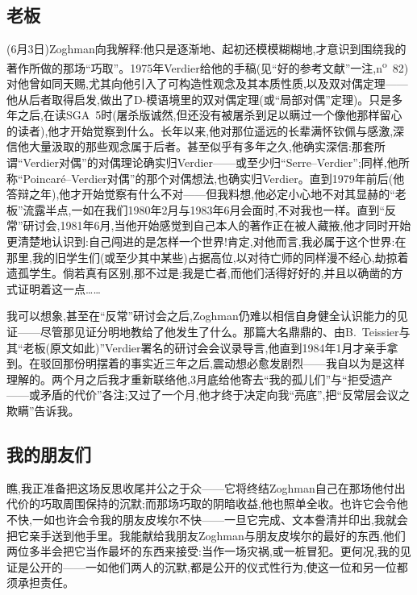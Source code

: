 \subsection{老板}


(6月3日)Zoghman向我解释:他只是逐渐地、起初还模模糊糊地,才意识到围绕我的著作所做的那场“巧取”。1975年Verdier给他的手稿(见“好的参考文献”一注,n\textsuperscript{o}~82)对他曾如同天赐,尤其向他引入了可构造性观念及其本质性质,以及双对偶定理——他从后者取得启发,做出了D-模语境里的双对偶定理(或“局部对偶”定理)。只是多年之后,在读SGA~5时(屠杀版诚然,但还没有被屠杀到足以瞒过一个像他那样留心的读者),他才开始觉察到什么。长年以来,他对那位遥远的长辈满怀钦佩与感激,深信他大量汲取的那些观念属于后者。甚至似乎有多年之久,他确实深信:那套所谓“Verdier对偶”的对偶理论确实归Verdier——或至少归“Serre--Verdier”;同样,他所称“Poincaré--Verdier对偶”的那个对偶想法,也确实归Verdier。直到1979年前后(他答辩之年),他才开始觉察有什么不对——但我料想,他必定小心地不对其显赫的“老板”流露半点,一如在我们1980年2月与1983年6月会面时,不对我也一样。直到“反常”研讨会,1981年6月,当他开始感觉到\dmark{}自己本人的著作正在被人藏掖,他才同时开始更清楚地认识到:自己闯进的是怎样一个世界!肯定,对他而言,我必属于这个世界:在那里,我的旧学生们(或至少其中某些)占据高位,以对待亡师的同样漫不经心,劫掠着遗孤学生。倘若真有区别,那不过是:我是亡者,而他们活得好好的,并且以确凿的方式证明着这一点……

我可以想象,甚至在“反常”研讨会之后,Zoghman仍难以相信自身健全认识能力的见证——尽管那见证分明地教给了他发生了什么。那篇大名鼎鼎的、由B.~Teissier与其“老板(原文如此)”Verdier署名的研讨会会议录导言,他直到1984年1月才亲手拿到。在驳回那份明摆着的事实近三年之后,震动想必愈发剧烈——我自以为是这样理解的。两个月之后我才重新联络他,3月底给他寄去“我的孤儿们”与“拒受遗产——或矛盾的代价”各注;又过了一个月,他才终于决定向我“亮底”,把“反常层会议之欺瞒”告诉我。

\subsection{我的朋友们}


瞧,我正准备把这场反思收尾并公之于众——它将终结Zoghman自己在那场他付出代价的巧取周围保持的沉默;而那场巧取的阴暗收益,他也照单全收。也许它会令他不快,一如也许会令我的朋友皮埃尔不快——一旦它完成、文本誊清并印出,我就会把它亲手送到他手里。我能献给我朋友Zoghman与朋友皮埃尔的\dmark{}最好的东西,他们两位多半会把它当作最坏的东西来接受:当作一场灾祸,或一桩冒犯。更何况,我的见证是公开的——一如他们两人的沉默,都是公开的仪式性行为,使这一位和另一位都须承担责任。

